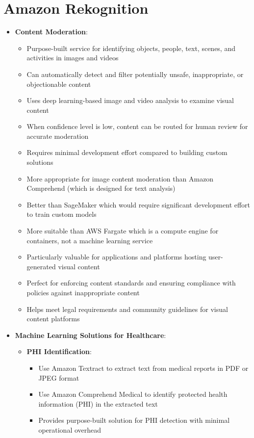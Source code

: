 \documentclass[11pt,a4paper]{report}
\begin{document}
\section{Amazon Rekognition}

\begin{itemize}
  \item \textbf{Content Moderation}:
\begin{itemize}
  \item Purpose-built service for identifying objects, people, text, scenes, and activities in images and videos
  \item Can automatically detect and filter potentially unsafe, inappropriate, or objectionable content
  \item Uses deep learning-based image and video analysis to examine visual content
  \item When confidence level is low, content can be routed for human review for accurate moderation
  \item Requires minimal development effort compared to building custom solutions
  \item More appropriate for image content moderation than Amazon Comprehend (which is designed for text analysis)
  \item Better than SageMaker which would require significant development effort to train custom models
  \item More suitable than AWS Fargate which is a compute engine for containers, not a machine learning service
  \item Particularly valuable for applications and platforms hosting user-generated visual content
  \item Perfect for enforcing content standards and ensuring compliance with policies against inappropriate content
  \item Helps meet legal requirements and community guidelines for visual content platforms
\end{itemize}
  \item \textbf{Machine Learning Solutions for Healthcare}:
\begin{itemize}
  \item \textbf{PHI Identification}:
\begin{itemize}
  \item Use Amazon Textract to extract text from medical reports in PDF or JPEG format
  \item Use Amazon Comprehend Medical to identify protected health information (PHI) in the extracted text
  \item Provides purpose-built solution for PHI detection with minimal operational overhead

\end{itemize}
\end{itemize}
\end{itemize}
\end{document}

